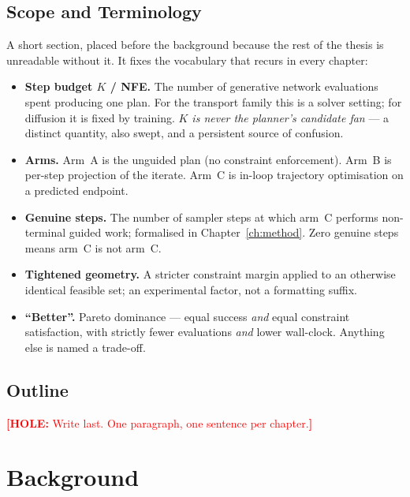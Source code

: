 \documentclass[headsepline,footsepline,footinclude=false,oneside,fontsize=11pt,paper=a4,listof=totoc,bibliography=totoc]{scrbook}
\newcommand{\hole}[1]{\textcolor{red}{\textbf{[HOLE:} #1\textbf{]}}}
\begin{document}
\section{Scope and Terminology}\label{sec:intro:scope}

A short section, placed before the background because the rest of the thesis is unreadable
without it. It fixes the vocabulary that recurs in every chapter:

\begin{itemize}
  \item \textbf{Step budget $K$ / NFE.} The number of generative network evaluations spent
    producing one plan. For the transport family this is a solver setting; for diffusion it
    is fixed by training. \emph{$K$ is never the planner's candidate fan} --- a distinct
    quantity, also swept, and a persistent source of confusion.
  \item \textbf{Arms.} Arm~A is the unguided plan (no constraint enforcement). Arm~B is
    per-step projection of the iterate. Arm~C is in-loop trajectory optimisation on a
    predicted endpoint.
  \item \textbf{Genuine steps.} The number of sampler steps at which arm~C performs
    non-terminal guided work; formalised in Chapter~\ref{ch:method}. Zero genuine steps
    means arm~C is not arm~C.
  \item \textbf{Tightened geometry.} A stricter constraint margin applied to an otherwise
    identical feasible set; an experimental factor, not a formatting suffix.
  \item \textbf{``Better''.} Pareto dominance --- equal success \emph{and} equal constraint
    satisfaction, with strictly fewer evaluations \emph{and} lower wall-clock. Anything else
    is named a trade-off.
\end{itemize}

\section{Outline}\label{sec:intro:outline}

\hole{Write last. One paragraph, one sentence per chapter.}

\chapter{Background}\label{ch:background}
\end{document}
